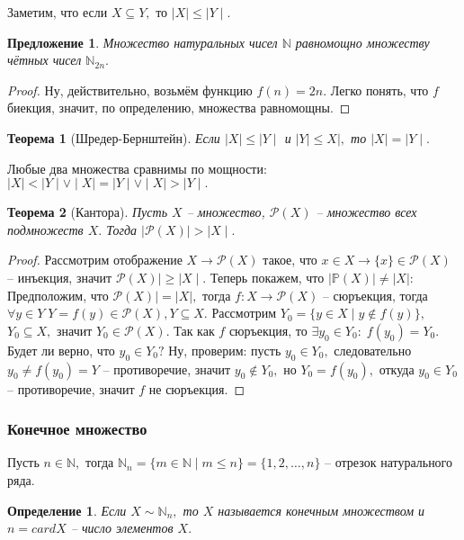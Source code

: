 \documentclass{article}
\newtheorem{Proposition}{Предложение}[section]
\newtheorem{Theorem}{Теорема}[section]
\newtheorem{Definition}{Определение}[section]
\begin{document}
Заметим, что если $X\subseteq Y,$ то $\mid X\mid \leq\mid Y\mid.$

\begin{Proposition}
Множество натуральных чисел $\mathbb{N}$ равномощно множеству чётных чисел $\mathbb{N}_{2n}.$
\end{Proposition}
\begin{proof}
Ну, действительно, возьмём функцию $f(n)=2n.$ Легко понять, что $f$ биекция, значит, по определению, множества равномощны.
\end{proof}

\begin{Theorem}[Шредер-Бернштейн]
Если $\mid X\mid\leq\mid Y\mid$ и $\mid Y\mid\leq X\mid,$ то $\mid X\mid = \mid Y\mid.$
\end{Theorem} 

Любые два множества сравнимы по мощности: $\mid X\mid<\mid Y\mid\vee \mid X\mid=\mid Y\mid\vee \mid X\mid>\mid Y\mid.$ 

\begin{Theorem}[Кантора]
Пусть $X$ -- множество, $\mathcal{P}(X)$ -- множество всех подмножеств $X.$ Тогда $\mid\mathcal{P}(X)\mid >\mid X\mid.$
\end{Theorem}
\begin{proof}
Рассмотрим отображение $X\rightarrow\mathcal{P}(X)$ такое, что $x\in X \rightarrow\{x\}\in\mathcal{P}(X)$ -- инъекция, значит $\mathcal{P}(X)\mid\geq\mid X\mid.$ Теперь покажем, что $\mid \mathbb{P}(X)\mid \neq\mid X\mid:$\\

Предположим, что $\mathcal{P}(X)\mid=\mid X\mid,$ тогда $f:X \rightarrow \mathcal{P}(X)$ -- сюръекция, тогда $\forall y \in Y \; Y=f(y)\in\mathcal{P}(X), Y\subseteq X.$ Рассмотрим $Y_0=\{y\in X\mid y\notin f(y)\},$  $Y_0\subseteq X,$ значит $Y_0\in\mathcal{P}(X).$ Так как $f$ сюръекция, то $\exists y_0 \in Y_0: \; f(y_0)=Y_0.$\\

Будет ли верно, что $y_0\in Y_0?$ Ну, проверим: пусть $y_0\in Y_0,$ следовательно $y_0 \neq f(y_0)=Y$ -- противоречие, значит $y_0 \notin Y_0,$ но $Y_0 = f(y_0),$ откуда $y_0\in Y_0$ -- противоречие, значит $f$ не сюръекция.
\end{proof}
\smallskip
\smallskip
\subsubsection{Конечное множество}
Пусть $n\in\mathbb{N},$ тогда $\mathbb{N}_n=\{m\in\mathbb{N}\mid m\leq n\}=\{1, 2,\ldots, n\}$ -- отрезок натурального ряда.
\begin{Definition}
Если $X\sim \mathbb{N}_n,$ то $X$ называется конечным множеством и $n=card X$ -- число элементов $X.$
\end{Definition}
\end{document}
